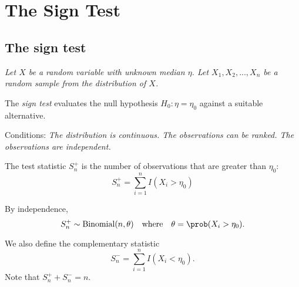 \chapter{The Sign Test}\label{chap:signtest}
\setcounter{page}{1}
\startcontents[chapters]
\chapcontents

\section{The sign test}
\bit
\it Let $X$ be a random variable with unknown median $\eta$.
\it Let $X_1, X_2, . . . , X_n$ be a random sample from the distribution of $X$.
\eit

The \emph{sign test} evaluates the null hypothesis $H_0:\eta=\eta_0$ against a suitable alternative. 

\vspace*{2ex}
Conditions:
%
%
%
\ben
\it The distribution is continuous.
\it The observations can be ranked.
\it The observations are independent.
\een



The test statistic $S^{+}_n$ is the number of observations that are greater than $\eta_0$: 
\[
S^{+}_n = \sum_{i=1}^n I(X_i>\eta_0) 
\]

By independence, 
\[
S^{+}_n\sim\text{Binomial}(n,\theta)\text{\quad where\quad} \theta=\prob(X_i>\eta_0).
\]



We also define the complementary statistic 
\[
S^{-}_n = \displaystyle\sum_{i=1}^n I(X_i<\eta_0).
\]
Note that $S^{+}_n + S^{-}_n = n$.

